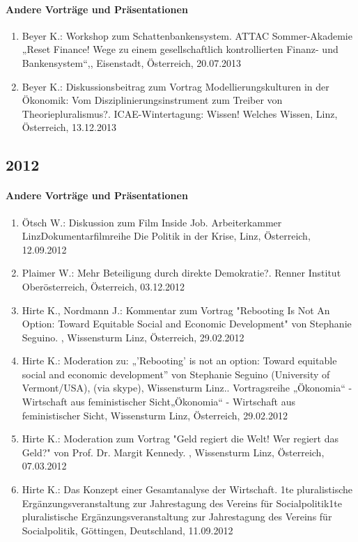 \paragraph{Andere Vorträge und Präsentationen}
\begin{enumerate}
	\item Beyer K.: Workshop zum Schattenbankensystem. ATTAC Sommer-Akademie „Reset Finance! Wege zu einem gesellschaftlich kontrollierten Finanz- und Bankensystem“,, Eisenstadt, Österreich, 20.07.2013
	\item Beyer K.: Diskussionsbeitrag zum Vortrag Modellierungskulturen in der Ökonomik: Vom Disziplinierungsinstrument zum Treiber von Theoriepluralismus?. ICAE-Wintertagung: Wissen! Welches Wissen, Linz, Österreich, 13.12.2013
\end{enumerate}
\subsection*{2012}
\paragraph{Andere Vorträge und Präsentationen}
\begin{enumerate}
	\item Ötsch W.: Diskussion zum Film Inside Job. Arbeiterkammer LinzDokumentarfilmreihe Die Politik in der Krise, Linz, Österreich, 12.09.2012
	\item Plaimer W.: Mehr Beteiligung durch direkte Demokratie?. Renner Institut Oberösterreich, Österreich, 03.12.2012
	\item Hirte K., Nordmann J.: Kommentar zum Vortrag "Rebooting Is Not An Option: Toward Equitable Social and Economic Development" von Stephanie Seguino. , Wissensturm Linz, Österreich, 29.02.2012
	\item Hirte K.: Moderation zu: „’Rebooting’ is not an option: Toward equitable social and economic development” von Stephanie Seguino (University of Vermont/USA), (via skype), Wissensturm Linz.. Vortragsreihe „Ökonomia“ - Wirtschaft aus feministischer Sicht„Ökonomia“ - Wirtschaft aus feministischer Sicht, Wissensturm Linz, Österreich, 29.02.2012
	\item Hirte K.: Moderation zum Vortrag "Geld regiert die Welt! Wer regiert das Geld?" von Prof. Dr. Margit Kennedy. , Wissensturm Linz, Österreich, 07.03.2012
	\item Hirte K.: Das Konzept einer Gesamtanalyse der Wirtschaft. 1te pluralistische Ergänzungsveranstaltung zur Jahrestagung des Vereins für Socialpolitik1te pluralistische Ergänzungsveranstaltung zur Jahrestagung des Vereins für Socialpolitik, Göttingen, Deutschland, 11.09.2012
\end{enumerate}
